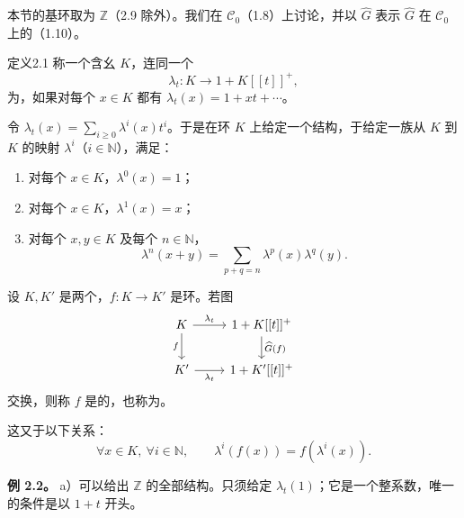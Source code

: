 本节的基环取为 $\mathbb Z$（2.9 除外）。我们在 $\mathscr C_0$（1.8）上讨论，并以 $\widehat G$ 表示 $\widehat G$ 在 $\mathscr C_0$ 上的（1.10）。
\begin{SGAresult}{定义}{2.1}
称一个含幺 $K$，连同一个
\[
\lambda_t:K\longrightarrow1+K[[t]]^+,
\]
为，如果对每个 $x\in K$ 都有 $\lambda_t(x)=1+xt+\cdots$。
\end{SGAresult}
令 $\lambda_t(x)=\sum_{i\geqslant0}\lambda^i(x)t^i$。于是在环 $K$ 上给定一个结构，于给定一族从 $K$ 到 $K$ 的映射 $\lambda^i$（$i\in\mathbb N$），满足：
\begin{enumerate}
\item[i)] 对每个 $x\in K$，$\lambda^0(x)=1$；
\item[ii)] 对每个 $x\in K$，$\lambda^1(x)=x$；
\item[iii)] 对每个 $x,y\in K$ 及每个 $n\in\mathbb N$，
\[
\lambda^n(x+y)=\sum_{p+q=n}\lambda^p(x)\lambda^q(y).
\]
\end{enumerate}
设 $K,K'$ 是两个，$f:K\longrightarrow K'$ 是环。若图
\[
\begin{tikzcd}
K\arrow[r,"\lambda_t"]\arrow[d,"f"'] & 1+K[[t]]^+\arrow[d,"\widehat G(f)"]\\
K'\arrow[r,"\lambda_t"'] & 1+K'[[t]]^+
\end{tikzcd}
\]
交换，则称 $f$ 是的，也称为。

这又于以下关系：
\[
\forall x\in K,\ \forall i\in\mathbb N,\qquad
\lambda^i(f(x))=f(\lambda^i(x)).
\]

\textbf{例 2.2。} a）可以给出 $\mathbb Z$ 的全部结构。只须给定 $\lambda_t(1)$；它是一个整系数，唯一的条件是以 $1+t$ 开头。

